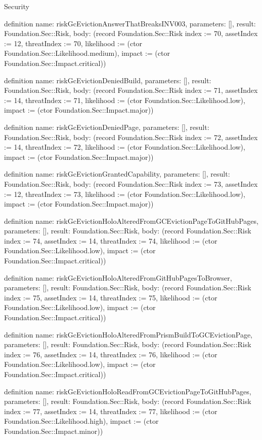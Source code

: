 \begin{lexlean}{Security}
\begin{semanticmodule}
definition{
  name: riskGcEvictionAnswerThatBreaksINV003,
  parameters: [],
  result: Foundation.Sec::Risk,
  body: (record Foundation.Sec::Risk {index := 70, assetIndex := 12, threatIndex := 70, likelihood := (ctor Foundation.Sec::Likelihood.medium), impact := (ctor Foundation.Sec::Impact.critical)})
}

definition{
  name: riskGcEvictionDeniedBuild,
  parameters: [],
  result: Foundation.Sec::Risk,
  body: (record Foundation.Sec::Risk {index := 71, assetIndex := 14, threatIndex := 71, likelihood := (ctor Foundation.Sec::Likelihood.low), impact := (ctor Foundation.Sec::Impact.major)})
}

definition{
  name: riskGcEvictionDeniedPage,
  parameters: [],
  result: Foundation.Sec::Risk,
  body: (record Foundation.Sec::Risk {index := 72, assetIndex := 14, threatIndex := 72, likelihood := (ctor Foundation.Sec::Likelihood.low), impact := (ctor Foundation.Sec::Impact.major)})
}

definition{
  name: riskGcEvictionGrantedCapability,
  parameters: [],
  result: Foundation.Sec::Risk,
  body: (record Foundation.Sec::Risk {index := 73, assetIndex := 12, threatIndex := 73, likelihood := (ctor Foundation.Sec::Likelihood.low), impact := (ctor Foundation.Sec::Impact.major)})
}

definition{
  name: riskGcEvictionHoloAlteredFromGCEvictionPageToGitHubPages,
  parameters: [],
  result: Foundation.Sec::Risk,
  body: (record Foundation.Sec::Risk {index := 74, assetIndex := 14, threatIndex := 74, likelihood := (ctor Foundation.Sec::Likelihood.low), impact := (ctor Foundation.Sec::Impact.critical)})
}

definition{
  name: riskGcEvictionHoloAlteredFromGitHubPagesToBrowser,
  parameters: [],
  result: Foundation.Sec::Risk,
  body: (record Foundation.Sec::Risk {index := 75, assetIndex := 14, threatIndex := 75, likelihood := (ctor Foundation.Sec::Likelihood.low), impact := (ctor Foundation.Sec::Impact.critical)})
}

definition{
  name: riskGcEvictionHoloAlteredFromPrismBuildToGCEvictionPage,
  parameters: [],
  result: Foundation.Sec::Risk,
  body: (record Foundation.Sec::Risk {index := 76, assetIndex := 14, threatIndex := 76, likelihood := (ctor Foundation.Sec::Likelihood.low), impact := (ctor Foundation.Sec::Impact.critical)})
}

definition{
  name: riskGcEvictionHoloReadFromGCEvictionPageToGitHubPages,
  parameters: [],
  result: Foundation.Sec::Risk,
  body: (record Foundation.Sec::Risk {index := 77, assetIndex := 14, threatIndex := 77, likelihood := (ctor Foundation.Sec::Likelihood.high), impact := (ctor Foundation.Sec::Impact.minor)})
}


\end{semanticmodule}
\end{lexlean}
